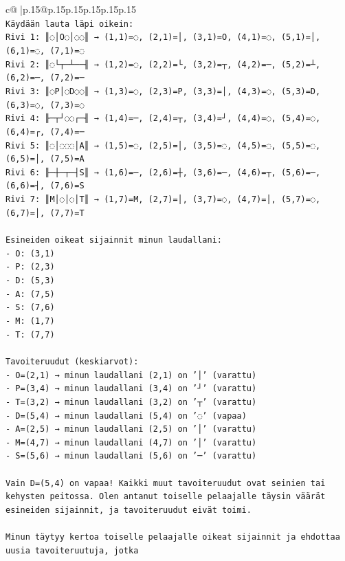 \documentclass{article}
\begin{document}
{\begin{supertabular}{c@{$\;$}|p{.15\linewidth}@{}p{.15\linewidth}p{.15\linewidth}p{.15\linewidth}p{.15\linewidth}p{.15\linewidth}}
{{{\\ 
\texttt{Käydään lauta läpi oikein:} \\
\texttt{Rivi 1: ║◌│O◌│◌◌║ → (1,1)=◌, (2,1)=│, (3,1)=O, (4,1)=◌, (5,1)=│, (6,1)=◌, (7,1)=◌} \\
\texttt{Rivi 2: ║◌└┬─┴──╢ → (1,2)=◌, (2,2)=└, (3,2)=┬, (4,2)=─, (5,2)=┴, (6,2)=─, (7,2)=─} \\
\texttt{Rivi 3: ║◌P│◌D◌◌║ → (1,3)=◌, (2,3)=P, (3,3)=│, (4,3)=◌, (5,3)=D, (6,3)=◌, (7,3)=◌} \\
\texttt{Rivi 4: ╟─┬┘◌◌┌─╢ → (1,4)=─, (2,4)=┬, (3,4)=┘, (4,4)=◌, (5,4)=◌, (6,4)=┌, (7,4)=─} \\
\texttt{Rivi 5: ║◌│◌◌◌│A║ → (1,5)=◌, (2,5)=│, (3,5)=◌, (4,5)=◌, (5,5)=◌, (6,5)=│, (7,5)=A} \\
\texttt{Rivi 6: ╟─┼─┬─┤S║ → (1,6)=─, (2,6)=┼, (3,6)=─, (4,6)=┬, (5,6)=─, (6,6)=┤, (7,6)=S} \\
\texttt{Rivi 7: ║M│◌│◌│T║ → (1,7)=M, (2,7)=│, (3,7)=◌, (4,7)=│, (5,7)=◌, (6,7)=│, (7,7)=T} \\
\\ 
\texttt{Esineiden oikeat sijainnit minun laudallani:} \\
\texttt{{-} O: (3,1)} \\
\texttt{{-} P: (2,3)} \\
\texttt{{-} D: (5,3)} \\
\texttt{{-} A: (7,5)} \\
\texttt{{-} S: (7,6)} \\
\texttt{{-} M: (1,7)} \\
\texttt{{-} T: (7,7)} \\
\\ 
\texttt{Tavoiteruudut (keskiarvot):} \\
\texttt{{-} O=(2,1) → minun laudallani (2,1) on '│' (varattu)} \\
\texttt{{-} P=(3,4) → minun laudallani (3,4) on '┘' (varattu)} \\
\texttt{{-} T=(3,2) → minun laudallani (3,2) on '┬' (varattu)} \\
\texttt{{-} D=(5,4) → minun laudallani (5,4) on '◌' (vapaa)} \\
\texttt{{-} A=(2,5) → minun laudallani (2,5) on '│' (varattu)} \\
\texttt{{-} M=(4,7) → minun laudallani (4,7) on '│' (varattu)} \\
\texttt{{-} S=(5,6) → minun laudallani (5,6) on '─' (varattu)} \\
\\ 
\texttt{Vain D=(5,4) on vapaa! Kaikki muut tavoiteruudut ovat seinien tai kehysten peitossa. Olen antanut toiselle pelaajalle täysin väärät esineiden sijainnit, ja tavoiteruudut eivät toimi.} \\
\\ 
\texttt{Minun täytyy kertoa toiselle pelaajalle oikeat sijainnit ja ehdottaa uusia tavoiteruutuja, jotka} \\
            }
        }
    }
     \\ \\


\end{supertabular}}
\end{document}
